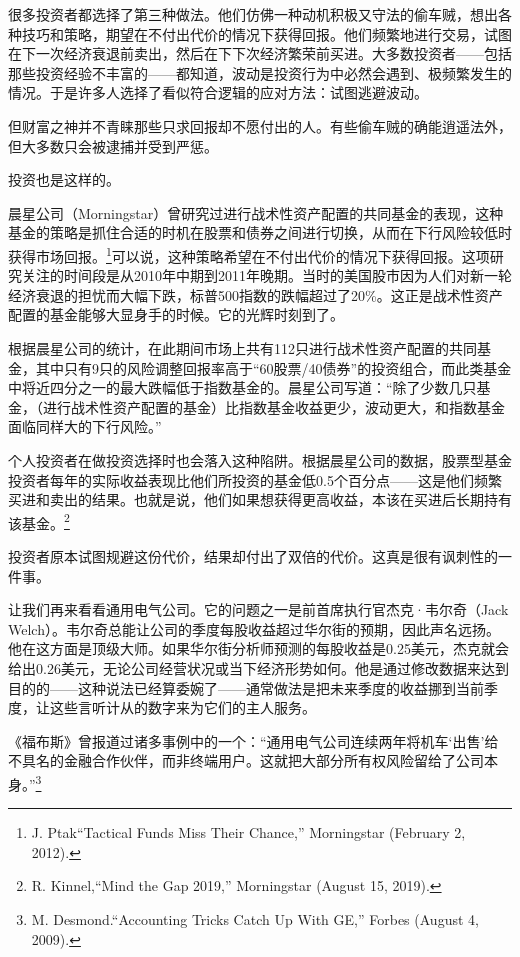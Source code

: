 很多投资者都选择了第三种做法。他们仿佛一种动机积极又守法的偷车贼，想出各种技巧和策略，期望在不付出代价的情况下获得回报。他们频繁地进行交易，试图在下一次经济衰退前卖出，然后在下下次经济繁荣前买进。大多数投资者——包括那些投资经验不丰富的——都知道，波动是投资行为中必然会遇到、极频繁发生的情况。于是许多人选择了看似符合逻辑的应对方法：试图逃避波动。

但财富之神并不青睐那些只求回报却不愿付出的人。有些偷车贼的确能逍遥法外，但大多数只会被逮捕并受到严惩。

投资也是这样的。

晨星公司（Morningstar）曾研究过进行战术性资产配置的共同基金的表现，这种基金的策略是抓住合适的时机在股票和债券之间进行切换，从而在下行风险较低时获得市场回报。\footnote{J. Ptak“Tactical Funds Miss Their Chance,” Morningstar (February 2, 2012).}可以说，这种策略希望在不付出代价的情况下获得回报。这项研究关注的时间段是从2010年中期到2011年晚期。当时的美国股市因为人们对新一轮经济衰退的担忧而大幅下跌，标普500指数的跌幅超过了20\%。这正是战术性资产配置的基金能够大显身手的时候。它的光辉时刻到了。

根据晨星公司的统计，在此期间市场上共有112只进行战术性资产配置的共同基金，其中只有9只的风险调整回报率高于“60股票/40债券”的投资组合，而此类基金中将近四分之一的最大跌幅低于指数基金的。晨星公司写道：“除了少数几只基金，（进行战术性资产配置的基金）比指数基金收益更少，波动更大，和指数基金面临同样大的下行风险。”

个人投资者在做投资选择时也会落入这种陷阱。根据晨星公司的数据，股票型基金投资者每年的实际收益表现比他们所投资的基金低0.5个百分点——这是他们频繁买进和卖出的结果。也就是说，他们如果想获得更高收益，本该在买进后长期持有该基金。\footnote{R. Kinnel,“Mind the Gap 2019,” Morningstar (August 15, 2019).}

投资者原本试图规避这份代价，结果却付出了双倍的代价。这真是很有讽刺性的一件事。

让我们再来看看通用电气公司。它的问题之一是前首席执行官杰克·韦尔奇（Jack Welch）。韦尔奇总能让公司的季度每股收益超过华尔街的预期，因此声名远扬。他在这方面是顶级大师。如果华尔街分析师预测的每股收益是0.25美元，杰克就会给出0.26美元，无论公司经营状况或当下经济形势如何。他是通过修改数据来达到目的的——这种说法已经算委婉了——通常做法是把未来季度的收益挪到当前季度，让这些言听计从的数字来为它们的主人服务。

《福布斯》曾报道过诸多事例中的一个：“通用电气公司连续两年将机车‘出售’给不具名的金融合作伙伴，而非终端用户。这就把大部分所有权风险留给了公司本身。”\footnote{M. Desmond.“Accounting Tricks Catch Up With GE,” Forbes (August 4, 2009).}

